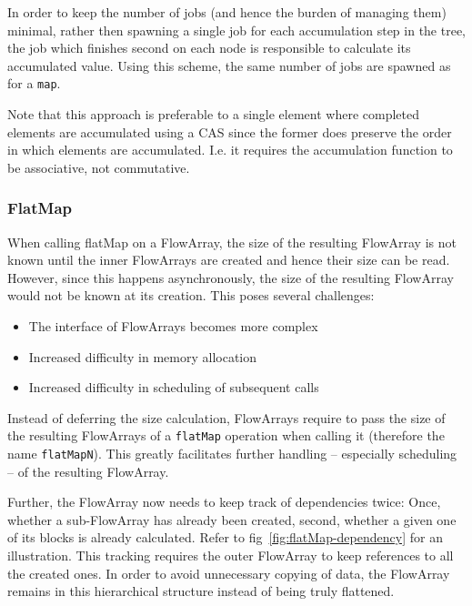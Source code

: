 \documentclass[runningheads,a4paper,fleqn]{llncs}
\begin{document}
In order to keep the number of jobs (and hence the burden of managing
them) minimal, rather then spawning a single job for each accumulation
step in the tree, the job which finishes second on each node is
responsible to calculate its accumulated value. Using this scheme, the
same number of jobs are spawned as for a \texttt{map}.

Note that this approach is preferable to a single element where
completed elements are accumulated using a CAS since the former
does preserve the order in which elements are accumulated. I.e. it
requires the accumulation function to be associative, not
commutative.

\subsubsection{FlatMap}
\label{sssec:flatMapN}

When calling flatMap on a FlowArray, the size of the resulting
FlowArray is not known until the inner FlowArrays are created and
hence their size can be read. However, since this happens
asynchronously, the size of the resulting FlowArray would not be known
at its creation. This poses several challenges:

\begin{itemize}
\item The interface of FlowArrays becomes more complex
\item Increased difficulty in memory allocation
\item Increased difficulty in scheduling of subsequent calls
\end{itemize}

Instead of deferring the size calculation, FlowArrays require to pass
the size of the resulting FlowArrays of a \texttt{flatMap} operation
when calling it (therefore the name \texttt{flatMapN}). This greatly 
facilitates further handling -- especially scheduling -- of the
resulting FlowArray.

Further, the FlowArray now needs to keep track of dependencies twice:
Once, whether a sub-FlowArray has already been created, second,
whether a given one of its blocks is already calculated. Refer to
fig~\ref{fig:flatMap-dependency} for an illustration. This tracking
requires the outer FlowArray to keep references to all the created
ones. In order to avoid unnecessary copying of data, the FlowArray
remains in this hierarchical structure instead of being truly
flattened.
\end{document}
